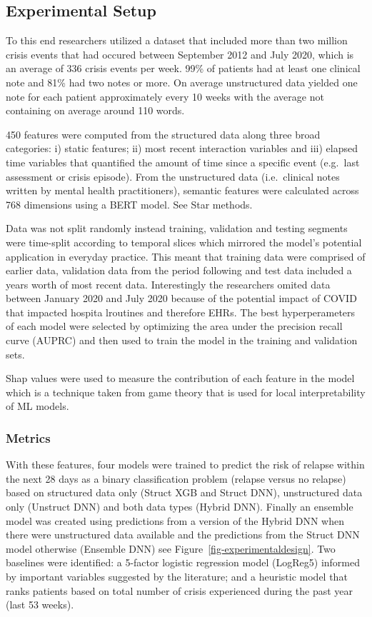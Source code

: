 \documentclass[
  letterpaper,
  DIV=11,
  numbers=noendperiod]{scrartcl}
\begin{document}
\subsection{\texorpdfstring{\textbf{Experimental
Setup}}{Experimental Setup}}\label{experimental-setup}

To this end researchers utilized a dataset that included more than two
million crisis events that had occured between September 2012 and July
2020, which is an average of 336 crisis events per week. 99\% of
patients had at least one clinical note and 81\% had two notes or more.
On average unstructured data yielded one note for each patient
approximately every 10 weeks with the average not containing on average
around 110 words.

450 features were computed from the structured data along three broad
categories: i) static features; ii) most recent interaction variables
and iii) elapsed time variables that quantified the amount of time since
a specific event (e.g.~last assessment or crisis episode). From the
unstructured data (i.e.~clinical notes written by mental health
practitioners), semantic features were calculated across 768 dimensions
using a BERT model. See Star methods.

Data was not split randomly instead training, validation and testing
segments were time-split according to temporal slices which mirrored the
model's potential application in everyday practice. This meant that
training data were comprised of earlier data, validation data from the
period following and test data included a years worth of most recent
data. Interestingly the researchers omited data between January 2020 and
July 2020 because of the potential impact of COVID that impacted hospita
lroutines and therefore EHRs. The best hyperperameters of each model
were selected by optimizing the area under the precision recall curve
(AUPRC) and then used to train the model in the training and validation
sets.

Shap values were used to measure the contribution of each feature in the
model which is a technique taken from game theory that is used for local
interpretability of ML models.

\subsubsection{Metrics}\label{metrics}

With these features, four models were trained to predict the risk of
relapse within the next 28 days as a binary classification problem
(relapse versus no relapse) based on structured data only (Struct XGB
and Struct DNN), unstructured data only (Unstruct DNN) and both data
types (Hybrid DNN). Finally an ensemble model was created using
predictions from a version of the Hybrid DNN when there were
unstructured data available and the predictions from the Struct DNN
model otherwise (Ensemble DNN) see Figure~\ref{fig-experimentaldesign}.
Two baselines were identified: a 5-factor logistic regression model
(LogReg5) informed by important variables suggested by the literature;
and a heuristic model that ranks patients based on total number of
crisis experienced during the past year (last 53 weeks).
\end{document}
